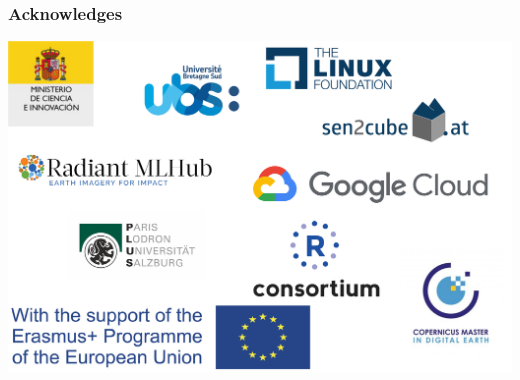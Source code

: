 \begin{frame}
	\frametitle{Acknowledges}
	\begin{center}
		\vspace{0.1cm}
		\includegraphics[scale=0.25]{images/acknowledge.pdf}
	\end{center}
\end{frame}